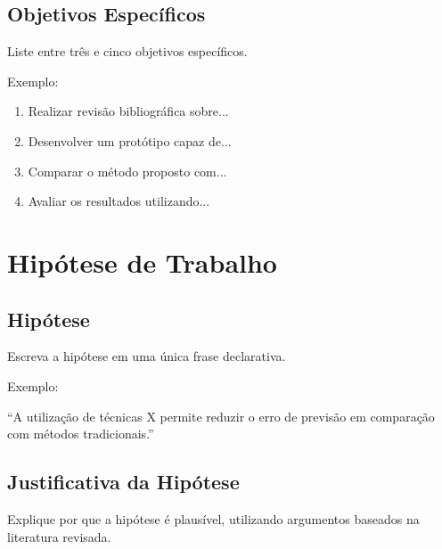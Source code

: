 \documentclass[10pt,a4paper]{extarticle}
\begin{document}
\subsection{Objetivos Específicos}

\begin{respbox}

Liste entre três e cinco objetivos específicos.

Exemplo:

\begin{enumerate}
\item Realizar revisão bibliográfica sobre...

\item Desenvolver um protótipo capaz de...

\item Comparar o método proposto com...

\item Avaliar os resultados utilizando...
\end{enumerate}

\end{respbox}


\section{Hipótese de Trabalho}

\subsection{Hipótese}

\begin{respbox}

Escreva a hipótese em uma única frase declarativa.

Exemplo:

``A utilização de técnicas X permite reduzir o erro de previsão
em comparação com métodos tradicionais.''

\end{respbox}


\subsection{Justificativa da Hipótese}

\begin{respbox}
Explique por que a hipótese é plausível, utilizando argumentos
baseados na literatura revisada.
\end{respbox}
\end{document}
